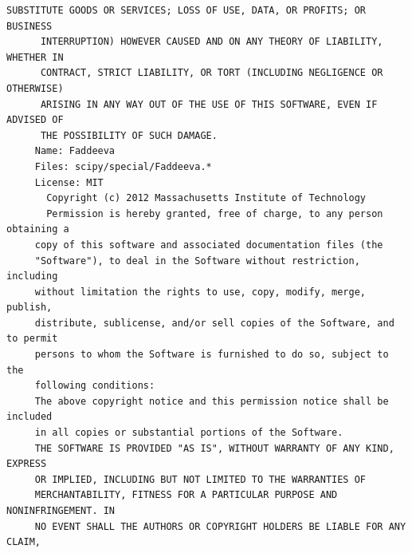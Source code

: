 \begin{lstlisting}[basicstyle=\ttfamily\footnotesize,breaklines=true]
      SUBSTITUTE GOODS OR SERVICES; LOSS OF USE, DATA, OR PROFITS; OR BUSINESS
      INTERRUPTION) HOWEVER CAUSED AND ON ANY THEORY OF LIABILITY, WHETHER IN
      CONTRACT, STRICT LIABILITY, OR TORT (INCLUDING NEGLIGENCE OR OTHERWISE)
      ARISING IN ANY WAY OUT OF THE USE OF THIS SOFTWARE, EVEN IF ADVISED OF
      THE POSSIBILITY OF SUCH DAMAGE.
     Name: Faddeeva
     Files: scipy/special/Faddeeva.*
     License: MIT
       Copyright (c) 2012 Massachusetts Institute of Technology
       Permission is hereby granted, free of charge, to any person obtaining a
     copy of this software and associated documentation files (the
     "Software"), to deal in the Software without restriction, including
     without limitation the rights to use, copy, modify, merge, publish,
     distribute, sublicense, and/or sell copies of the Software, and to permit
     persons to whom the Software is furnished to do so, subject to the
     following conditions:
     The above copyright notice and this permission notice shall be included
     in all copies or substantial portions of the Software.
     THE SOFTWARE IS PROVIDED "AS IS", WITHOUT WARRANTY OF ANY KIND, EXPRESS
     OR IMPLIED, INCLUDING BUT NOT LIMITED TO THE WARRANTIES OF
     MERCHANTABILITY, FITNESS FOR A PARTICULAR PURPOSE AND NONINFRINGEMENT. IN
     NO EVENT SHALL THE AUTHORS OR COPYRIGHT HOLDERS BE LIABLE FOR ANY CLAIM,





\end{lstlisting}
